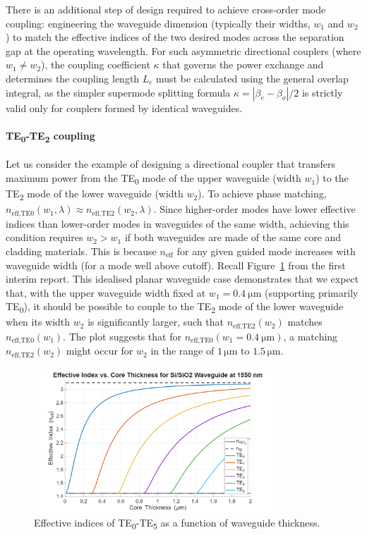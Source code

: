 \documentclass[10pt, a4paper]{article}
\begin{document}
There is an additional step of design required to achieve cross-order mode coupling:
engineering the waveguide dimension (typically their widths, \(w_1\) and \(w_2\)) to match the effective indices of the two desired modes across the separation gap at the operating wavelength.
For such asymmetric directional couplers (where \(w_1 \neq w_2\)), the coupling coefficient \(\kappa\) that governs the power exchange and determines the coupling length \(L_c\) must be calculated using the general overlap integral, as the simpler supermode splitting formula \(\kappa = |\beta_e - \beta_o|/2\) is strictly valid only for couplers formed by identical waveguides.

\paragraph{TE\textsubscript{0}-TE\textsubscript{2} coupling}
Let us consider the example of designing a directional coupler that transfers maximum power from the TE\textsubscript{0} mode of the upper waveguide (width \(w_1\)) to the TE\textsubscript{2} mode of the lower waveguide (width \(w_2\)).
To achieve phase matching, \(n_{\text{eff,TE0}}(w_1, \lambda) \approx n_{\text{eff,TE2}}(w_2, \lambda)\).
Since higher-order modes have lower effective indices than lower-order modes in waveguides of the same width, achieving this condition requires \(w_2 > w_1\) if both waveguides are made of the same core and cladding materials. This is because \(n_\text{eff}\) for any given guided mode increases with waveguide width (for a mode well above cutoff).
Recall Figure~\ref{fig:te_neff} from the first interim report\autocite{ngSB4IntegratedPhotonics2025}.
This idealised planar waveguide case demonstrates that we expect that,
with the upper waveguide width fixed at \(w_1=\SI{0.4}{\um}\) (supporting primarily TE\textsubscript{0}),
it should be possible to couple to the TE\textsubscript{2} mode of the lower waveguide when its width \(w_2\) is significantly larger, such that \(n_{\text{eff,TE2}}(w_2)\) matches \(n_{\text{eff,TE0}}(w_1)\).
The plot suggests that for \(n_{\text{eff,TE0}}(w_1=\SI{0.4}{\um})\), a matching \(n_{\text{eff,TE2}}(w_2)\) might occur for \(w_2\) in the range of \(1\,\unit{\um}\) to \(1.5\,\unit{\um}\).

\begin{figure}[h!]
  \centering
  \includegraphics[width=0.8\textwidth]{task1/neff_vs_thickness_Si_SiO2_1550nm.png}
  \caption{Effective indices of TE\textsubscript{0}-TE\textsubscript{5} as a function of waveguide thickness.}
  \label{fig:te_neff}
\end{figure}
\end{document}
